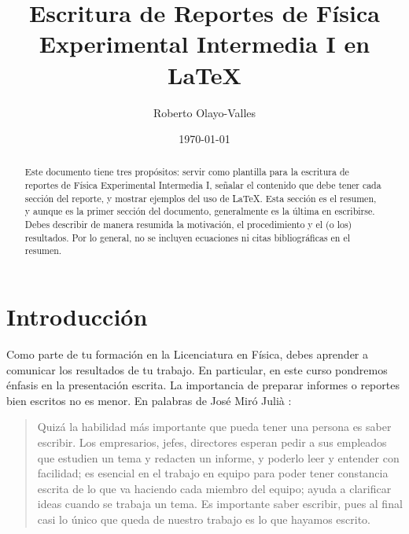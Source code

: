 \documentclass[aps,prb,twocolumn, amsmath, amssymb]{revtex4-2}
\begin{document}
\title{Escritura de Reportes de Física Experimental Intermedia I en \LaTeX}

\author{Roberto Olayo-Valles}

\date{\today}

\begin{abstract}
	Este documento tiene tres propósitos: servir como plantilla para la escritura de reportes de Física Experimental Intermedia I, señalar el contenido que debe tener cada sección del reporte, y mostrar ejemplos del uso de \LaTeX. Esta sección es el resumen, y aunque es la primer sección del documento, generalmente es la última en escribirse. Debes describir de manera resumida la motivación, el procedimiento y el (o los) resultados. Por lo general, no se incluyen ecuaciones ni citas bibliográficas en el resumen.
\end{abstract}

\maketitle

\section{\label{sec:intro}Introducción}
Como parte de tu formación en la Licenciatura en Física, debes aprender a comunicar los resultados de tu trabajo. En particular, en este curso pondremos énfasis en la presentación escrita. La importancia de preparar informes o reportes bien escritos no es menor. En palabras de José Miró Julià \cite{Miro}:

\begin{quote}
	Quizá la habilidad más importante que pueda tener una persona es saber escribir. Los empresarios, jefes, directores esperan pedir a sus empleados que estudien un tema y redacten un informe, y poderlo leer y entender con facilidad; es esencial en el trabajo en equipo para poder tener constancia escrita de lo que va haciendo cada miembro del equipo; ayuda a clarificar ideas cuando se trabaja un tema. Es importante saber escribir, pues al final casi lo único que queda de nuestro trabajo es lo que hayamos escrito.
\end{quote}
\end{document}
